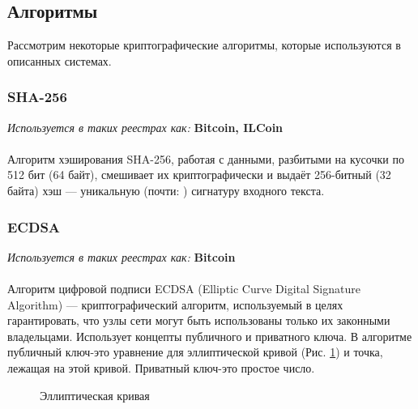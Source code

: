 \subsection{Алгоритмы}
Рассмотрим некоторые криптографические алгоритмы, которые используются в описанных системах.
\subsubsection{SHA-256}
\emph{Используется в таких реестрах как: } \textbf{Bitcoin, ILCoin}\\\\
Алгоритм хэширования SHA-256, работая с данными, разбитыми на кусочки по 512
бит (64 байт), смешивает их криптографически и выдаёт 256-битный (32 байта) хэш
--- уникальную (почти: \cite{Jim2012}) сигнатуру входного текста.
\subsubsection{ECDSA}
\emph{Используется в таких реестрах как:} \textbf{Bitcoin} \\\\
Алгоритм цифровой подписи ECDSA (Elliptic Curve Digital Signature Algorithm)
--- криптографический алгоритм, используемый в целях гарантировать, что узлы
сети могут быть использованы только их законными владельцами. Использует
концепты публичного и приватного ключа. В алгоритме публичный ключ-это
уравнение для эллиптической кривой (Рис. \ref{elliptic_curve}) и точка, лежащая
на этой кривой. Приватный ключ-это простое число.

\begin{figure}[h]
    \centering
    \caption{Эллиптическая кривая}\label{elliptic_curve}
\end{figure}

